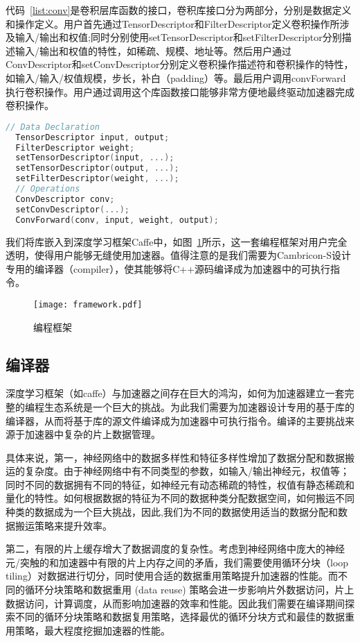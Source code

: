 代码~\ref{list:conv}是卷积层库函数的接口，卷积库接口分为两部分，分别是数据定义和操作定义。用户首先通过TensorDescriptor和FilterDescriptor定义卷积操作所涉及输入/输出和权值;同时分别使用setTensorDescriptor和setFilterDescriptor分别描述输入/输出和权值的特性，如稀疏、规模、地址等。然后用户通过ConvDescriptor和setConvDescriptor分别定义卷积操作描述符和卷积操作的特性，如输入/输入/权值规模，步长，补白（padding）等。最后用户调用convForward执行卷积操作。用户通过调用这个库函数接口能够非常方便地最终驱动加速器完成卷积操作。

\newpage

\begin{lstlisting}[language=C, frame=single, basicstyle=\footnotesize, caption=卷积层库函数接口, label=list:conv, captionpos=b]
  // Data Declaration
  TensorDescriptor input, output;
  FilterDescriptor weight;
  setTensorDescriptor(input, ...);
  setTensorDescriptor(output, ...);
  setFilterDescriptor(weight, ...);
  // Operations
  ConvDescriptor conv;
  setConvDescriptor(...);
  ConvForward(conv, input, weight, output);
\end{lstlisting}

我们将库嵌入到深度学习框架Caffe中，如图~\ref{fig:framework}所示，这一套编程框架对用户完全透明，使得用户能够无缝使用加速器。值得注意的是我们需要为Cambricon-S设计专用的编译器（compiler），使其能够将C++源码编译成为加速器中的可执行指令。

\begin{figure}[ht]
\centering
\texttt{[image: framework.pdf]}
\caption{编程框架}
\label{fig:framework}
\end{figure}

\subsection{编译器}
深度学习框架（如caffe）与加速器之间存在巨大的鸿沟，如何为加速器建立一套完整的编程生态系统是一个巨大的挑战。为此我们需要为加速器设计专用的基于库的编译器，从而将基于库的源文件编译成为加速器中可执行指令。编译的主要挑战来源于加速器中复杂的片上数据管理。

具体来说，第一，神经网络中的数据多样性和特征多样性增加了数据分配和数据搬运的复杂度。由于神经网络中有不同类型的参数，如输入/输出神经元，权值等；同时不同的数据拥有不同的特征，如神经元有动态稀疏的特性，权值有静态稀疏和量化的特性。如何根据数据的特征为不同的数据种类分配数据空间，如何搬运不同种类的数据成为一个巨大挑战，因此,我们为不同的数据使用适当的数据分配和数据搬运策略来提升效率。

第二，有限的片上缓存增大了数据调度的复杂性。考虑到神经网络中庞大的神经元/突触的和加速器中有限的片上内存之间的矛盾，我们需要使用循环分块（loop tiling）对数据进行切分，同时使用合适的数据重用策略提升加速器的性能。而不同的循环分块策略和数据重用 (data reuse) 策略会进一步影响片外数据访问，片上数据访问，计算调度，从而影响加速器的效率和性能。因此我们需要在编译期间探索不同的循环分块策略和数据复用策略，选择最优的循环分块方式和最佳的数据重用策略，最大程度挖掘加速器的性能。

